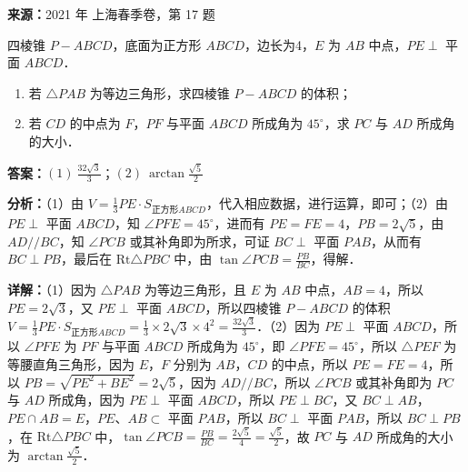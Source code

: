 \begin{question}[points=14]
\textbf{来源：}2021 年 上海春季卷，第 17 题\par
四棱锥 $P-ABCD$，底面为正方形 $ABCD$，边长为4，$E$ 为 $AB$ 中点，$PE\perp$ 平面 $ABCD$．\begin{enumerate}\item[(1)] 若 $\triangle PAB$ 为等边三角形，求四棱锥 $P-ABCD$ 的体积；\item[(2)] 若 $CD$ 的中点为 $F$，$PF$ 与平面 $ABCD$ 所成角为 $45^\circ$，求 $PC$ 与 $AD$ 所成角的大小．\end{enumerate}
\begin{solution}
\textbf{答案：}$(1)\ \frac{32\sqrt{3}}{3}$；$(2)\ \arctan\frac{\sqrt{5}}{2}$

\textbf{分析：}（1）由 $V=\frac{1}{3}PE\cdot S_{\text{正方形}ABCD}$，代入相应数据，进行运算，即可；\newline（2）由 $PE\perp$ 平面 $ABCD$，知 $\angle PFE=45^\circ$，进而有 $PE=FE=4$，$PB=2\sqrt{5}$，由 $AD//BC$，知 $\angle PCB$ 或其补角即为所求，可证 $BC\perp$ 平面 $PAB$，从而有 $BC\perp PB$，最后在 $\text{Rt}\triangle PBC$ 中，由 $\tan\angle PCB=\frac{PB}{BC}$，得解．

\textbf{详解：}（1）因为 $\triangle PAB$ 为等边三角形，且 $E$ 为 $AB$ 中点，$AB=4$，所以 $PE=2\sqrt{3}$，又 $PE\perp$ 平面 $ABCD$，所以四棱锥 $P-ABCD$ 的体积 $V=\frac{1}{3}PE\cdot S_{\text{正方形}ABCD}=\frac{1}{3}\times 2\sqrt{3}\times 4^2=\frac{32\sqrt{3}}{3}$．\newline（2）因为 $PE\perp$ 平面 $ABCD$，所以 $\angle PFE$ 为 $PF$ 与平面 $ABCD$ 所成角为 $45^\circ$，即 $\angle PFE=45^\circ$，所以 $\triangle PEF$ 为等腰直角三角形，因为 $E$，$F$ 分别为 $AB$，$CD$ 的中点，所以 $PE=FE=4$，所以 $PB=\sqrt{PE^2+BE^2}=2\sqrt{5}$，因为 $AD//BC$，所以 $\angle PCB$ 或其补角即为 $PC$ 与 $AD$ 所成角，因为 $PE\perp$ 平面 $ABCD$，所以 $PE\perp BC$，又 $BC\perp AB$，$PE\cap AB=E$，$PE$、$AB\subset$ 平面 $PAB$，所以 $BC\perp$ 平面 $PAB$，所以 $BC\perp PB$，在 $\text{Rt}\triangle PBC$ 中，$\tan\angle PCB=\frac{PB}{BC}=\frac{2\sqrt{5}}{4}=\frac{\sqrt{5}}{2}$，故 $PC$ 与 $AD$ 所成角的大小为 $\arctan\frac{\sqrt{5}}{2}$．
\end{solution}
\end{question}

